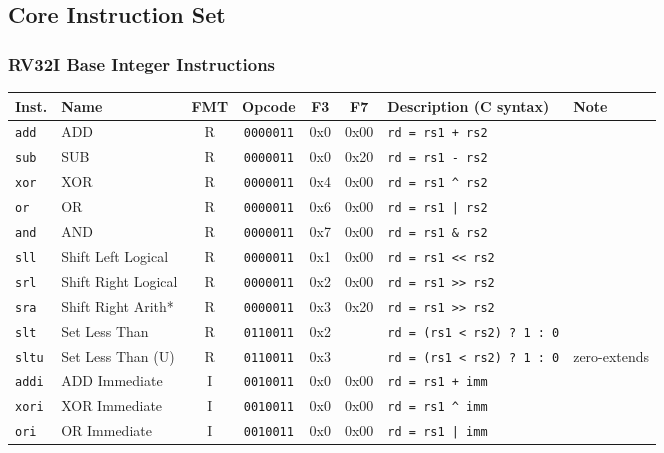 \documentclass{article}
\newcommand{\code}[1]{\texttt{#1}}
\begin{document}
\subsection*{Core Instruction Set}

\subsubsection*{RV32I Base Integer Instructions}

\begin{tabular}
{l | l | c | c | c | c | l | l}
Inst.       & Name                    & FMT & Opcode        & F3  & F7    & Description (C syntax)          & Note     \\ \hline
\code{add}  & ADD                     & R  & \code{0000011} & 0x0 & 0x00  & \code{rd = rs1 + rs2}           & \\
\code{sub}  & SUB                     & R  & \code{0000011} & 0x0 & 0x20  & \code{rd = rs1 - rs2}           & \\
\code{xor}  & XOR                     & R  & \code{0000011} & 0x4 & 0x00  & \code{rd = rs1 \^{} rs2}        & \\
\code{or}   & OR                      & R  & \code{0000011} & 0x6 & 0x00  & \code{rd = rs1 | rs2}           & \\
\code{and}  & AND                     & R  & \code{0000011} & 0x7 & 0x00  & \code{rd = rs1 \& rs2}          & \\
\code{sll}  & Shift Left Logical      & R  & \code{0000011} & 0x1 & 0x00  & \code{rd = rs1 << rs2}          & \\
\code{srl}  & Shift Right Logical     & R  & \code{0000011} & 0x2 & 0x00  & \code{rd = rs1 >> rs2}          & \\
\code{sra}  & Shift Right Arith*      & R  & \code{0000011} & 0x3 & 0x20  & \code{rd = rs1 >> rs2}          & \\ \hline
\code{slt}  & Set Less Than           & R  & \code{0110011} & 0x2 &       & \code{rd = (rs1 < rs2) ? 1 : 0} & \\
\code{sltu} & Set Less Than (U)       & R  & \code{0110011} & 0x3 &       & \code{rd = (rs1 < rs2) ? 1 : 0} & zero-extends \\
\code{addi} & ADD Immediate           & I  & \code{0010011} & 0x0 & 0x00  & \code{rd = rs1 + imm}           & \\
\code{xori} & XOR Immediate           & I  & \code{0010011} & 0x0 & 0x00  & \code{rd = rs1 \^{} imm}        & \\
\code{ori}  & OR Immediate            & I  & \code{0010011} & 0x0 & 0x00  & \code{rd = rs1 | imm}           & \\

\end{tabular}
\end{document}
